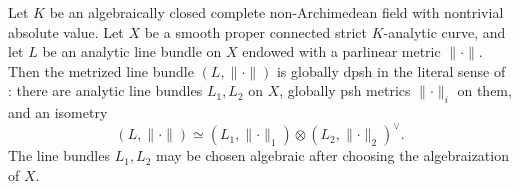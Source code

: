 
\begin{proposition}
\label{prop:p083-curve-parlinear-global-dpsh}
Let \(K\) be an algebraically closed complete non-Archimedean field with
nontrivial absolute value.  Let \(X\) be a smooth proper connected strict
\(K\)-analytic curve, and let \(L\) be an analytic line bundle on \(X\)
endowed with a parlinear metric \(\lVert\cdot\rVert\).  Then the metrized
line bundle \((L,\lVert\cdot\rVert)\) is globally dpsh in the literal sense
of \cite[17.8.5]{CLD25}: there are analytic line bundles \(L_1,L_2\) on
\(X\), globally psh metrics \(\lVert\cdot\rVert_i\) on them, and an
isometry
\[
 (L,\lVert\cdot\rVert)\simeq
 (L_1,\lVert\cdot\rVert_1)\otimes
 (L_2,\lVert\cdot\rVert_2)^{\vee}.
\]
The line bundles \(L_1,L_2\) may be chosen algebraic after choosing the
algebraization of \(X\).
\end{proposition}
